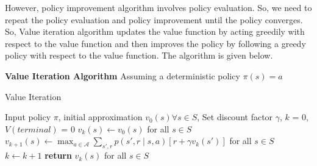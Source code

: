 \documentclass[../main.tex]{subfiles}
\begin{document}
However, policy improvement algorithm involves policy evaluation. So, we need to repeat the policy evaluation and policy improvement until the policy converges. So, Value iteration algorithm updates the value function by acting greedily with respect to the value function and then improves the policy by following a greedy policy with respect to the value function. The algorithm is given below.

\textbf{Value Iteration Algorithm}
\newline
Assuming a deterministic policy $\pi(s) = a$
\begin{algorithm}
\caption{Value Iteration}
\label{alg:value_iteration}
\begin{algorithmic}[1]
\State Input policy $\pi$, initial approximation $v_0(s) \forall s \in S$,
\State Set discount factor $\gamma$, $k$ = 0, $V(terminal)$ = 0
\State $v_k(s) \leftarrow v_0(s)$ for all $s \in S$
\State $v_{k+1}(s) \leftarrow \max_{a \in \mathcal{A}} \sum_{s', r} p(s', r \mid s, a) \left[ r + \gamma v_k(s') \right]$ for all $s \in S$
\State $k \leftarrow k + 1$
\EndWhile
\State \textbf{return} $v_k(s)$ for all $s \in S$
\end{algorithmic}
\end{algorithm}
\end{document}
